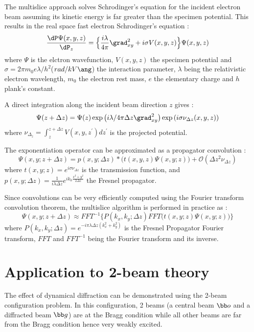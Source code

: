 \documentclass[a4paper,10pt]{article}
\begin{document}
The multislice approach solves Schrodinger's equation for the incident electron beam assuming its kinetic energy is far greater than the specimen potential. This results in the real space fast electron Schrodinger's equation \cite{Kirkland2019}:
\begin{equation}\label{eq:FESE}
  \frac{\dP\Psi(x,y,z)}{\dP_z} =
    \Big\{\frac{i\lambda}{4\pi}\grad^2_{xy} + i\sigma V(x,y,z)\Big\} \Psi(x,y,z)
\end{equation}
where $\Psi$ is the elctron wavefunction,
$V(x,y,z)$ the specimen potential and
$\sigma=2\pi m_0e\lambda/h^2$($rad/kV\ang$) the interaction parameter, $\lambda$ being the relativistic electron wavelength, $m_0$ the electron rest mass, $e$ the elementary charge and $h$ plank's constant.

A direct integration along the incident beam direction $z$ gives :
\begin{equation}
  \Psi(z+\Delta z) = \Psi(z)
  \exp\left(i\lambda/4\pi\Delta z\grad^2_{xy}\right)
  \exp\left(i\sigma\nu_{\Delta z}(x,y,z)\right)
\end{equation}
where $\nu_{\Delta_z}=\int_z^{z+\Delta z}V(x,y,z^{'})dz^{'}$
is the projected potential.

The exponentiation operator can be approximated as a propagator convolution :
\begin{equation}\label{eq:MS_conv}
  \Psi(x,y;z+\Delta z) = p(x,y;\Delta z)\ast\Big(t(x,y,z)\Psi(x,y;z)\Big)
  +\mathcal O(\Delta z^2\nu_{\Delta z})
\end{equation}
where $t(x,y;z)=e^{i\sigma\nu_{\Delta z}}$ is the transmission function, and $p(x,y;\Delta z)=\frac{1}{i\lambda\Delta z}e^{ik_0\frac{x^2+y^2}{2\Delta z}}$ the Fresnel propagator.

Since convolutions can be very efficiently computed using the Fourier transform convolution theorem, the multislice algorithm is performed in practice as :
\begin{equation}\label{eq:MS_FFT}
  \Psi(x,y;z+\Delta z) \approx FFT^{-1}\Bigg\{
    P(k_x,k_y;\Delta z) FFT\Big(t(x,y;z)\Psi(x,y;z)\Big)
  \Bigg\}
\end{equation}
where $P(k_x,k_y;\Delta z)=e^{-i\pi\lambda\Delta z(k_x^2+k_y^2)}$ is the Fresnel Propagator Fourier transform, $FFT$ and $FFT^{-1}$ being the Fourier transform and its inverse.




\newpage
\section{Application to 2-beam theory}\label{chap:2_beam_theory}
The effect of dynamical diffraction can be demonstrated using the 2-beam configuration problem. In this configuration, 2 beams (a central beam $\bb o$ and a diffracted beam $\bb g$) are at the Bragg condition while all other beams are far from the Bragg condition hence very weakly excited.
\end{document}
